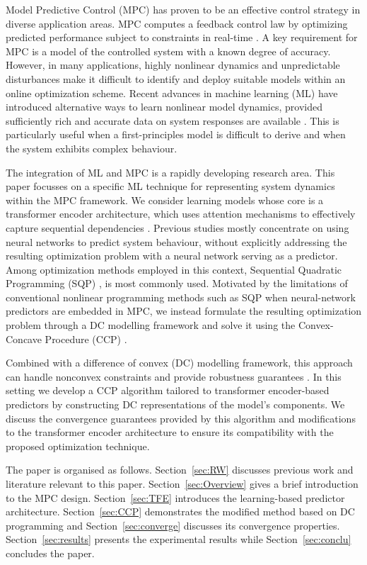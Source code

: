 \documentclass{ifacconf}
\begin{document}
Model Predictive Control (MPC) has proven to be an effective control strategy in diverse application areas. MPC computes a feedback control law by optimizing predicted performance subject to constraints in real-time \citep{kouvaritakis2015model,rawlings2017model}. A key requirement for MPC is a  model of the controlled system with a known degree of accuracy. However, in many  applications, highly nonlinear dynamics and unpredictable disturbances make it difficult to identify and deploy suitable models within an online optimization scheme. Recent advances in machine learning (ML) have introduced alternative ways to learn nonlinear model dynamics, provided sufficiently rich and accurate data on system responses are available \citep{NOROUZI2023105878}. This is particularly useful when a first-principles model is difficult to derive and when the system exhibits complex behaviour. 

The integration of ML and MPC is a rapidly developing research area. This paper focusses on a specific ML technique for representing system dynamics within the MPC framework. We consider learning models whose core is a transformer encoder architecture, which uses attention mechanisms to effectively capture sequential dependencies \citep{10.5555/3295222.3295349}. Previous studies mostly concentrate on using neural networks to predict system behaviour, without explicitly addressing the resulting optimization problem with a neural network serving as a predictor. Among optimization methods employed in this context, Sequential Quadratic Programming (SQP) \citep[e.g.][]{Nocedal2006}, is most commonly used. Motivated by the limitations of conventional nonlinear programming methods such as SQP when neural-network predictors are embedded in MPC, we instead formulate the resulting optimization problem through a DC modelling framework and solve it using the Convex-Concave Procedure (CCP) \citep{Lipp2016}.

Combined with a difference of convex (DC) modelling framework, this approach can handle nonconvex constraints and provide robustness guarantees \citep{9993390,ju_2,KRAUSCH20241699}. In this setting we develop a CCP algorithm tailored to transformer encoder-based predictors by constructing DC representations of the model's components. We discuss the convergence guarantees provided by this algorithm and modifications to the transformer encoder architecture to ensure its compatibility with the proposed optimization technique. 

The paper is organised as follows. Section~\ref{sec:RW} discusses previous work and literature relevant to this paper. Section~\ref{sec:Overview} gives a brief introduction to the MPC design. Section~\ref{sec:TFE} introduces the learning-based predictor architecture. Section~\ref{sec:CCP} demonstrates the modified method based on DC programming and Section~\ref{sec:converge} discusses its convergence properties. Section~\ref{sec:results} presents the experimental results while Section~\ref{sec:conclu} concludes the paper.
\end{document}
